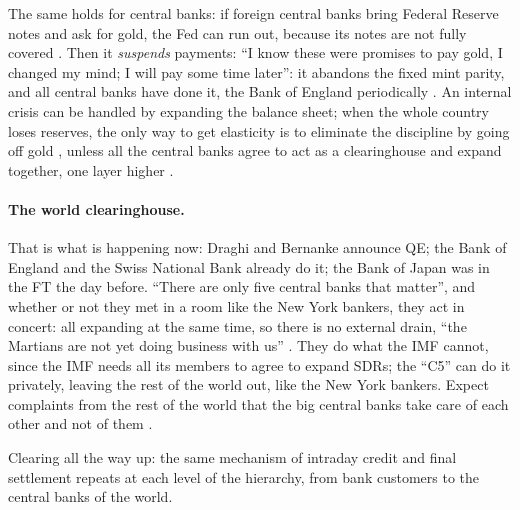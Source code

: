 \begin{paracol}{2}
The same holds for central banks: if foreign central banks bring Federal Reserve notes and ask for gold, the Fed can run out, because its notes are
not fully covered . Then it \emph{suspends} payments: ``I know these were promises to pay gold, I changed my mind; I will pay
some time later'': it abandons the fixed mint parity, and all central banks have done it, the Bank of England periodically
. An internal crisis can be handled by expanding the balance sheet; when the whole country loses reserves, the only way to
get elasticity is to eliminate the discipline by going off gold , unless all the central banks agree to act as a clearinghouse
and expand together, one layer higher .

\paragraph{The world clearinghouse.} That is what is happening now: Draghi and Bernanke announce QE; the Bank of England and the Swiss National Bank
already do it; the Bank of Japan was in the FT the day before. ``There are only five central banks that matter'', and whether or not they met in a room
like the New York bankers, they act in concert: all expanding at the same time, so there is no external drain, ``the Martians are not yet doing business
with us'' . They do what the IMF cannot, since the IMF needs all its members to agree to expand
SDRs; the ``C5'' can do it privately, leaving the rest of the world out, like the New York bankers. Expect complaints from the rest of the world that the
big central banks take care of each other and not of them .

\begin{nfigure}
\caption{Clearing all the way up: the same mechanism of intraday credit and final settlement repeats at each level of the hierarchy, from bank customers to
the central banks of the world.}\label{fig:ch-levels}
\end{nfigure}


\end{paracol}
